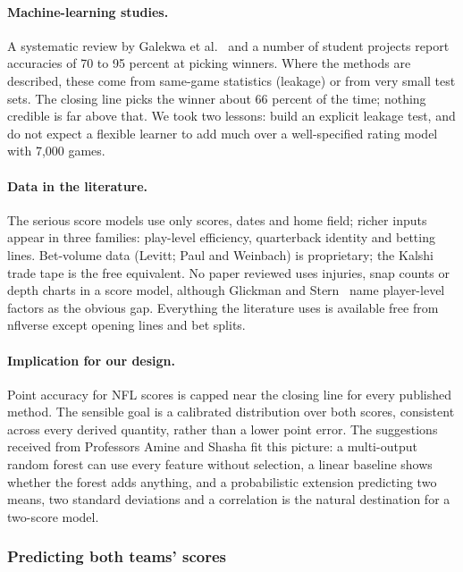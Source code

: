 \paragraph{Machine-learning studies.} A systematic review by Galekwa et al.~\cite{mlreview2024} and a number of student projects report accuracies of 70 to 95 percent at picking winners. Where the methods are described, these come from same-game statistics (leakage) or from very small test sets. The closing line picks the winner about 66 percent of the time; nothing credible is far above that. We took two lessons: build an explicit leakage test, and do not expect a flexible learner to add much over a well-specified rating model with 7,000 games.

\paragraph{Data in the literature.} The serious score models use only scores, dates and home field; richer inputs appear in three families: play-level efficiency, quarterback identity and betting lines. Bet-volume data (Levitt; Paul and Weinbach) is proprietary; the Kalshi trade tape is the free equivalent. No paper reviewed uses injuries, snap counts or depth charts in a score model, although Glickman and Stern~\cite{glickmanstern2017} name player-level factors as the obvious gap. Everything the literature uses is available free from nflverse except opening lines and bet splits.

\paragraph{Implication for our design.} Point accuracy for NFL scores is capped near the closing line for every published method. The sensible goal is a calibrated distribution over both scores, consistent across every derived quantity, rather than a lower point error. The suggestions received from Professors Amine and Shasha fit this picture: a multi-output random forest can use every feature without selection, a linear baseline shows whether the forest adds anything, and a probabilistic extension predicting two means, two standard deviations and a correlation is the natural destination for a two-score model.

\subsubsection{Predicting both teams' scores}\label{sec:scoremodel}


